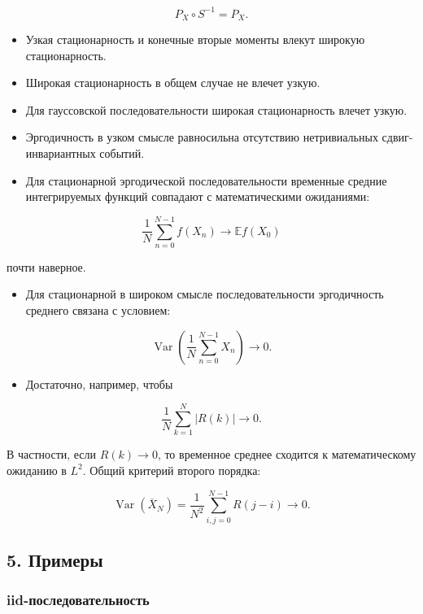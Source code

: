 \documentclass[
  11pt,
  a4paper,
]{article}
\providecommand{\tightlist}{%
  \setlength{\itemsep}{0pt}\setlength{\parskip}{0pt}}
\begin{document}
\[
P_X\circ S^{-1}=P_X.
\]

\begin{itemize}
\tightlist
\item
  Узкая стационарность и конечные вторые моменты влекут широкую
  стационарность.
\item
  Широкая стационарность в общем случае не влечет узкую.
\item
  Для гауссовской последовательности широкая стационарность влечет
  узкую.
\item
  Эргодичность в узком смысле равносильна отсутствию нетривиальных
  сдвиг-инвариантных событий.
\item
  Для стационарной эргодической последовательности временные средние
  интегрируемых функций совпадают с математическими ожиданиями:
\end{itemize}

\[
\frac1N\sum_{n=0}^{N-1}f(X_n)\to\mathbb E f(X_0)
\]

почти наверное.

\begin{itemize}
\tightlist
\item
  Для стационарной в широком смысле последовательности эргодичность
  среднего связана с условием:
\end{itemize}

\[
\operatorname{Var}\left(\frac1N\sum_{n=0}^{N-1}X_n\right)\to0.
\]

\begin{itemize}
\tightlist
\item
  Достаточно, например, чтобы
\end{itemize}

\[
\frac1N\sum_{k=1}^{N}|R(k)|\to0.
\]

В частности, если \(R(k)\to0\), то временное среднее сходится к
математическому ожиданию в \(L^2\). Общий критерий второго порядка:

\[
\operatorname{Var}(\overline X_N)=
\frac1{N^2}\sum_{i,j=0}^{N-1}R(j-i)\to0.
\]

\subsection{5. Примеры}\label{ux43fux440ux438ux43cux435ux440ux44b}

\subsubsection{iid-последовательность}\label{iid-ux43fux43eux441ux43bux435ux434ux43eux432ux430ux442ux435ux43bux44cux43dux43eux441ux442ux44c}
\end{document}
